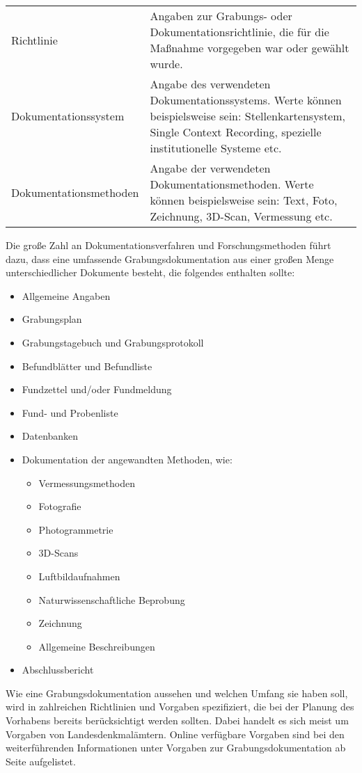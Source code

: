 \begin{center}
\begin{longtable}{L{0.25\textwidth} p{0.68\textwidth}}
		Richtlinie & Angaben zur Grabungs- oder Dokumentationsrichtlinie, die für die Maßnahme vorgegeben war oder gewählt wurde.\\
		Dokumentationssystem & Angabe des verwendeten Dokumentationssystems. Werte können beispielsweise sein: Stellenkartensystem, Single Context Recording, spezielle institutionelle Systeme etc.\\
		Dokumentationsmethoden & Angabe der verwendeten Dokumentationsmethoden. Werte können beispielsweise sein: Text, Foto, Zeichnung, 3D-Scan, Vermessung etc. \\
		\bottomrule
	\end{longtable}
\end{center}

Die große Zahl an Dokumentationsverfahren und Forschungsmethoden führt dazu, dass eine umfassende Grabungsdokumentation aus einer großen Menge unterschiedlicher Dokumente besteht, die folgendes enthalten sollte:
\begin{itemize}
	\item Allgemeine Angaben
	\item Grabungsplan
	\item Grabungstagebuch und Grabungsprotokoll
	\item Befundblätter und Befundliste
	\item Fundzettel und/oder Fundmeldung
	\item Fund- und Probenliste
	\item Datenbanken
	\item Dokumentation der angewandten Methoden, wie:
	\begin{itemize}
		\item Vermessungsmethoden
		\item Fotografie
		\item Photogrammetrie
		\item 3D-Scans
		\item Luftbildaufnahmen
		\item Naturwissenschaftliche Beprobung
		\item Zeichnung
		\item Allgemeine Beschreibungen
	\end{itemize}
	\item Abschlussbericht
\end{itemize}

Wie eine Grabungsdokumentation aussehen und welchen Umfang sie haben soll, wird in zahlreichen Richtlinien und Vorgaben spezifiziert, die bei der Planung des Vorhabens bereits berücksichtigt werden sollten. Dabei handelt es sich meist um Vorgaben von Landesdenkmalämtern. Online verfügbare Vorgaben sind bei den weiterführenden Informationen unter Vorgaben zur Grabungsdokumentation ab Seite \pageref{Metadaten-ListeLDA} aufgelistet.

